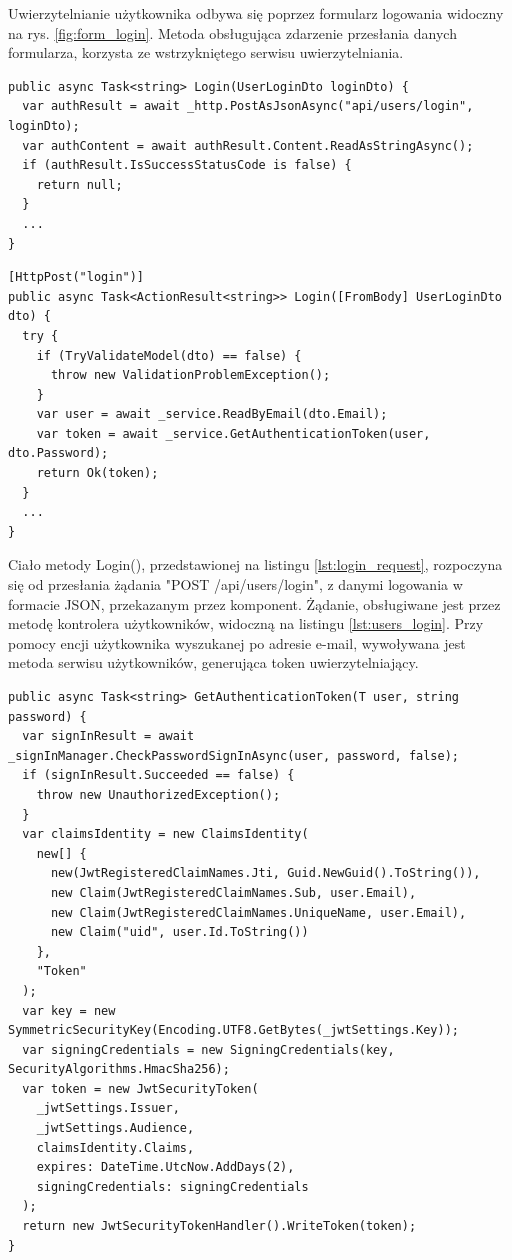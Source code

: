 Uwierzytelnianie użytkownika odbywa się poprzez formularz logowania widoczny na rys. \ref{fig:form_login}. Metoda obsługująca zdarzenie przesłania danych formularza, korzysta ze wstrzykniętego serwisu uwierzytelniania.

\begin{lstlisting}[language=CSharp, caption={Metoda uwierzytelniająca użytkownika, w klasie serwisu uwierzytelniającego aplikacji klienckiej}, label=lst:login_request]
public async Task<string> Login(UserLoginDto loginDto) {
  var authResult = await _http.PostAsJsonAsync("api/users/login", loginDto);
  var authContent = await authResult.Content.ReadAsStringAsync();
  if (authResult.IsSuccessStatusCode is false) {
    return null;
  }
  ...
}
\end{lstlisting}

\begin{lstlisting}[language=CSharp, caption={Metoda kontrolera użytkowników, obsługująca żądanie uwierzytelniające}, label=lst:users_login]
[HttpPost("login")]
public async Task<ActionResult<string>> Login([FromBody] UserLoginDto dto) {
  try {
    if (TryValidateModel(dto) == false) {
      throw new ValidationProblemException();
    }
    var user = await _service.ReadByEmail(dto.Email);
    var token = await _service.GetAuthenticationToken(user, dto.Password);
    return Ok(token);
  }
  ...
}
\end{lstlisting}

Ciało metody Login(), przedstawionej na listingu \ref{lst:login_request}, rozpoczyna się od przesłania żądania "POST /api/users/login", z danymi logowania w formacie JSON, przekazanym przez komponent. Żądanie, obsługiwane jest przez metodę kontrolera użytkowników, widoczną na listingu \ref{lst:users_login}. Przy pomocy encji użytkownika wyszukanej po adresie e-mail, wywoływana jest metoda serwisu użytkowników, generująca token uwierzytelniający.

\begin{lstlisting}[language=CSharp, caption={Metoda serwisu użytkowników, generująca tokeny uwierzytelniające}, label=lst:genToken]
public async Task<string> GetAuthenticationToken(T user, string password) {
  var signInResult = await _signInManager.CheckPasswordSignInAsync(user, password, false);
  if (signInResult.Succeeded == false) {
    throw new UnauthorizedException();
  }
  var claimsIdentity = new ClaimsIdentity(
    new[] {
      new(JwtRegisteredClaimNames.Jti, Guid.NewGuid().ToString()), 
      new Claim(JwtRegisteredClaimNames.Sub, user.Email),
      new Claim(JwtRegisteredClaimNames.UniqueName, user.Email), 
      new Claim("uid", user.Id.ToString())
    },
    "Token"
  );
  var key = new SymmetricSecurityKey(Encoding.UTF8.GetBytes(_jwtSettings.Key));
  var signingCredentials = new SigningCredentials(key, SecurityAlgorithms.HmacSha256);
  var token = new JwtSecurityToken(
    _jwtSettings.Issuer,
    _jwtSettings.Audience,
    claimsIdentity.Claims,
    expires: DateTime.UtcNow.AddDays(2),
    signingCredentials: signingCredentials
  );
  return new JwtSecurityTokenHandler().WriteToken(token);
}
\end{lstlisting}

